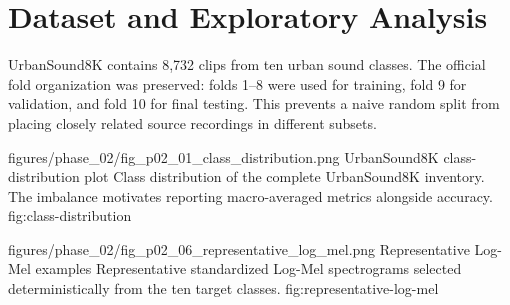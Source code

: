 \section{Dataset and Exploratory Analysis}

UrbanSound8K contains 8,732 clips from ten urban sound classes. The official
fold organization was preserved: folds 1--8 were used for training, fold 9 for
validation, and fold 10 for final testing. This prevents a naive random split
from placing closely related source recordings in different subsets.



\ProjectFigure
  {figures/phase_02/fig_p02_01_class_distribution.png}
  {\columnwidth}
  {UrbanSound8K class-distribution plot}
  {Class distribution of the complete UrbanSound8K inventory. The imbalance
  motivates reporting macro-averaged metrics alongside accuracy.}
  {fig:class-distribution}

\ProjectFigure
  {figures/phase_02/fig_p02_06_representative_log_mel.png}
  {\columnwidth}
  {Representative Log-Mel examples}
  {Representative standardized Log-Mel spectrograms selected
  deterministically from the ten target classes.}
  {fig:representative-log-mel}

